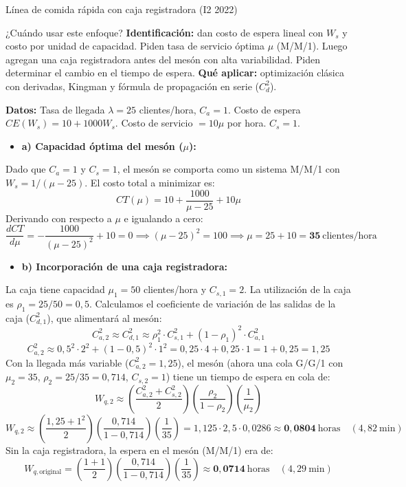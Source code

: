 \begin{ejercicio}{Línea de comida rápida con caja registradora (I2 2022)}

\begin{tipprueba}{¿Cuándo usar este enfoque?}
\textbf{Identificación:} dan costo de espera lineal con $W_s$ y costo por unidad de capacidad. Piden tasa de servicio óptima $\mu$ (M/M/1). Luego agregan una caja registradora antes del mesón con alta variabilidad. Piden determinar el cambio en el tiempo de espera. \textbf{Qué aplicar:} optimización clásica con derivadas, Kingman y fórmula de propagación en serie ($C_d^2$).
\end{tipprueba}

\textbf{Datos:} Tasa de llegada $\lambda = 25$ clientes/hora, $C_a = 1$. Costo de espera $CE(W_s) = 10 + 1000 W_s$. Costo de servicio $= 10 \mu$ por hora. $C_s = 1$.
\begin{itemize}
  \item \textbf{a) Capacidad óptima del mesón ($\mu$):}
\end{itemize}
  Dado que $C_a = 1$ y $C_s = 1$, el mesón se comporta como un sistema M/M/1 con $W_s = 1/(\mu - 25)$.
  El costo total a minimizar es:
  \[
    CT(\mu) = 10 + \frac{1000}{\mu - 25} + 10 \mu
  \]
  Derivando con respecto a $\mu$ e igualando a cero:
  \[
    \frac{dCT}{d\mu} = -\frac{1000}{(\mu - 25)^2} + 10 = 0 \implies (\mu - 25)^2 = 100 \implies \mu = 25 + 10 = \mathbf{35}\ \text{clientes/hora}
  \]
\begin{itemize}
  \item \textbf{b) Incorporación de una caja registradora:}
\end{itemize}
  La caja tiene capacidad $\mu_1 = 50$ clientes/hora y $C_{s,1} = 2$.
  La utilización de la caja es $\rho_1 = 25/50 = 0{,}5$.
  Calculamos el coeficiente de variación de las salidas de la caja ($C_{d,1}^2$), que alimentará al mesón:
  \[
    C_{a,2}^2 \approx C_{d,1}^2 \approx \rho_1^2 \cdot C_{s,1}^2 + (1 - \rho_1)^2 \cdot C_{a,1}^2
  \]
  \[
    C_{a,2}^2 \approx 0{,}5^2 \cdot 2^2 + (1 - 0{,}5)^2 \cdot 1^2 = 0{,}25 \cdot 4 + 0{,}25 \cdot 1 = 1 + 0{,}25 = 1{,}25
  \]
  Con la llegada más variable ($C_{a,2}^2 = 1{,}25$), el mesón (ahora una cola G/G/1 con $\mu_2 = 35$, $\rho_2 = 25/35 = 0{,}714$, $C_{s,2} = 1$) tiene un tiempo de espera en cola de:
  \[
    W_{q,2} \approx \left( \frac{C_{a,2}^2 + C_{s,2}^2}{2} \right) \left( \frac{\rho_2}{1 - \rho_2} \right) \left( \frac{1}{\mu_2} \right)
  \]
  \[
    W_{q,2} \approx \left( \frac{1{,}25 + 1^2}{2} \right) \left( \frac{0{,}714}{1 - 0{,}714} \right) \left( \frac{1}{35} \right) = 1{,}125 \cdot 2{,}5 \cdot 0{,}0286 \approx \mathbf{0{,}0804}\ \text{horas} \quad (4{,}82\ \text{min})
  \]
  Sin la caja registradora, la espera en el mesón (M/M/1) era de:
  \[
    W_{q,\text{original}} = \left( \frac{1+1}{2} \right) \left( \frac{0{,}714}{1 - 0{,}714} \right) \left( \frac{1}{35} \right) \approx \mathbf{0{,}0714}\ \text{horas} \quad (4{,}29\ \text{min})
  \]


\end{ejercicio}
